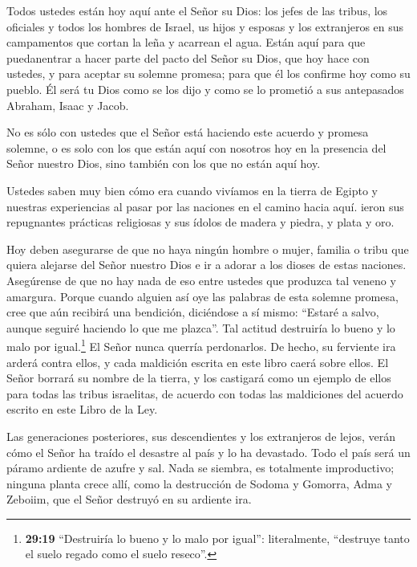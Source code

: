  Todos ustedes están hoy aquí ante el Señor su Dios: los
jefes de las tribus, los oficiales y todos los hombres de Israel,
 us hijos y esposas y los extranjeros en sus campamentos
que cortan la leña y acarrean el agua.  Están aquí para que
puedanentrar a hacer parte del pacto del Señor su Dios, que hoy hace con
ustedes, y para aceptar su solemne promesa;  para que él
los confirme hoy como su pueblo. Él será tu Dios como se los dijo y como
se lo prometió a sus antepasados Abraham, Isaac y Jacob.

 No es sólo con ustedes que el Señor está haciendo este
acuerdo y promesa solemne,  o es solo con los que están
aquí con nosotros hoy en la presencia del Señor nuestro Dios, sino
también con los que no están aquí hoy.

 Ustedes saben muy bien cómo era cuando vivíamos en la
tierra de Egipto y nuestras experiencias al pasar por las naciones en el
camino hacia aquí.  ieron sus repugnantes prácticas
religiosas y sus ídolos de madera y piedra, y plata y oro.

 Hoy deben asegurarse de que no haya ningún hombre o mujer,
familia o tribu que quiera alejarse del Señor nuestro Dios e ir a adorar
a los dioses de estas naciones. Asegúrense de que no hay nada de eso
entre ustedes que produzca tal veneno y amargura.  Porque
cuando alguien así oye las palabras de esta solemne promesa, cree que
aún recibirá una bendición, diciéndose a sí mismo: ``Estaré a salvo,
aunque seguiré haciendo lo que me plazca''. Tal actitud destruiría lo
bueno y lo malo por igual.\footnote{\textbf{29:19} ``Destruiría lo bueno
  y lo malo por igual'': literalmente, ``destruye tanto el suelo regado
  como el suelo reseco''.}  El Señor nunca querría
perdonarlos. De hecho, su ferviente ira arderá contra ellos, y cada
maldición escrita en este libro caerá sobre ellos. El Señor borrará su
nombre de la tierra,  y los castigará como un ejemplo de
ellos para todas las tribus israelitas, de acuerdo con todas las
maldiciones del acuerdo escrito en este Libro de la Ley.

 Las generaciones posteriores, sus descendientes y los
extranjeros de lejos, verán cómo el Señor ha traído el desastre al país
y lo ha devastado.  Todo el país será un páramo ardiente de
azufre y sal. Nada se siembra, es totalmente improductivo; ninguna
planta crece allí, como la destrucción de Sodoma y Gomorra, Adma y
Zeboiim, que el Señor destruyó en su ardiente ira.

